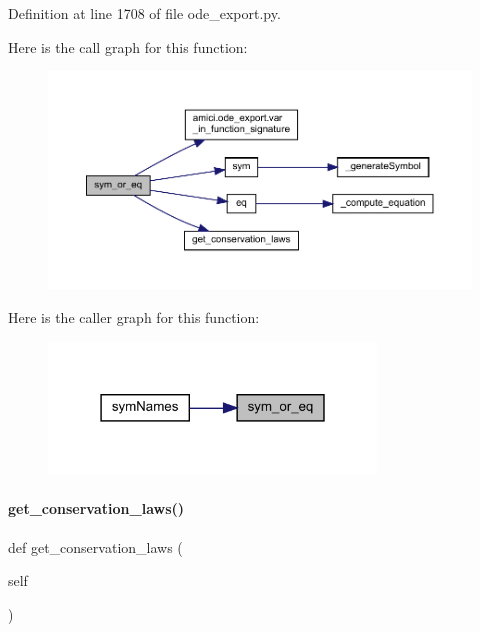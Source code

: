 Definition at line 1708 of file ode\+\_\+export.\+py.

Here is the call graph for this function\+:
\nopagebreak
\begin{figure}[H]
\begin{center}
\leavevmode
\includegraphics[width=350pt]{classamici_1_1ode__export_1_1_o_d_e_model_ae352b13e8ea2f390c5fa146601817173_cgraph}
\end{center}
\end{figure}
Here is the caller graph for this function\+:
\nopagebreak
\begin{figure}[H]
\begin{center}
\leavevmode
\includegraphics[width=247pt]{classamici_1_1ode__export_1_1_o_d_e_model_ae352b13e8ea2f390c5fa146601817173_icgraph}
\end{center}
\end{figure}
\mbox{\label{classamici_1_1ode__export_1_1_o_d_e_model_acbd9a0c022a1b5cbc09848bcac0de613}} 
\paragraph{\texorpdfstring{get\_conservation\_laws()}{get\_conservation\_laws()}}
{\footnotesize\ttfamily def get\+\_\+conservation\+\_\+laws (\begin{DoxyParamCaption}\item[{}]{self }\end{DoxyParamCaption})}

